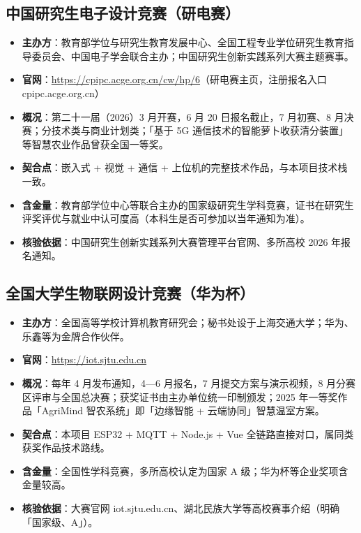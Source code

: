 \documentclass[11pt]{ctexart}
\begin{document}
\subsection{中国研究生电子设计竞赛（研电赛）}
\begin{itemize}
  \item \textbf{主办方}：教育部学位与研究生教育发展中心、全国工程专业学位研究生教育指导委员会、中国电子学会联合主办；中国研究生创新实践系列大赛主题赛事。
  \item \textbf{官网}：\url{https://cpipc.acge.org.cn/cw/hp/6}（研电赛主页，注册报名入口 cpipc.acge.org.cn）
  \item \textbf{概况}：第二十一届（2026）3 月开赛，6 月 20 日报名截止，7 月初赛、8 月决赛；分技术类与商业计划类；「基于 5G 通信技术的智能萝卜收获清分装置」等智慧农业作品曾获全国一等奖。
  \item \textbf{契合点}：嵌入式 + 视觉 + 通信 + 上位机的完整技术作品，与本项目技术栈一致。
  \item \textbf{含金量}：教育部学位中心等联合主办的国家级研究生学科竞赛，证书在研究生评奖评优与就业中认可度高（本科生是否可参加以当年通知为准）。
  \item \textbf{核验依据}：中国研究生创新实践系列大赛管理平台官网、多所高校 2026 年报名通知。
\end{itemize}

\subsection{全国大学生物联网设计竞赛（华为杯）}
\begin{itemize}
  \item \textbf{主办方}：全国高等学校计算机教育研究会；秘书处设于上海交通大学；华为、乐鑫等为金牌合作伙伴。
  \item \textbf{官网}：\url{https://iot.sjtu.edu.cn}
  \item \textbf{概况}：每年 4 月发布通知，4—6 月报名，7 月提交方案与演示视频，8 月分赛区评审与全国总决赛；获奖证书由主办单位统一印制颁发；2025 年一等奖作品「AgriMind 智农系统」即「边缘智能 + 云端协同」智慧温室方案。
  \item \textbf{契合点}：本项目 ESP32 + MQTT + Node.js + Vue 全链路直接对口，属同类获奖作品技术路线。
  \item \textbf{含金量}：全国性学科竞赛，多所高校认定为国家 A 级；华为杯等企业奖项含金量较高。
  \item \textbf{核验依据}：大赛官网 iot.sjtu.edu.cn、湖北民族大学等高校赛事介绍（明确「国家级、A」）。
\end{itemize}
\end{document}
